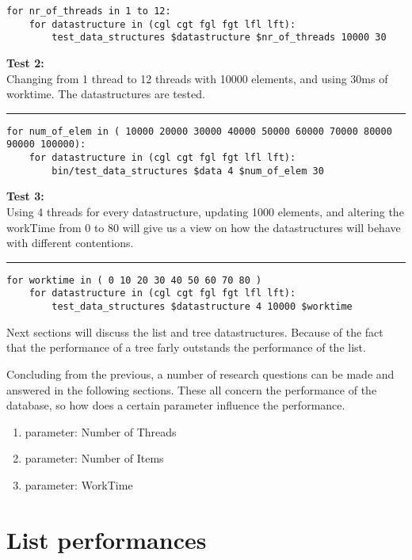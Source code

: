 \documentclass[10pt,a4paper]{article}
\begin{document}
\begin{lstlisting}
for nr_of_threads in 1 to 12:
    for datastructure in (cgl cgt fgl fgt lfl lft):
        test_data_structures $datastructure $nr_of_threads 10000 30  
\end{lstlisting}


\textbf{Test 2:} \\
Changing from 1 thread to 12 threads with 10000 elements, and using 30ms of 
worktime. The datastructures are tested.
\vspace{0.1cm}
\hrule
\vspace{0.1cm}
\begin{lstlisting}
for num_of_elem in ( 10000 20000 30000 40000 50000 60000 70000 80000 90000 100000):
    for datastructure in (cgl cgt fgl fgt lfl lft):
        bin/test_data_structures $data 4 $num_of_elem 30
\end{lstlisting}



\textbf{Test 3:} \\
Using 4 threads for every datastructure, updating 1000 elements, and altering the workTime from 0 to 80 will give us a view on how the datastructures will behave with different contentions. 
\vspace{0.1cm}
\hrule
\vspace{0.1cm}
\begin{lstlisting}
for worktime in ( 0 10 20 30 40 50 60 70 80 )
    for datastructure in (cgl cgt fgl fgt lfl lft):
        test_data_structures $datastructure 4 10000 $worktime  
\end{lstlisting}

Next sections will discuss the list and tree datastructures. Because of the fact that the performance of a tree farly outstands the performance of the list.

Concluding from the previous, a number of research questions can be made and answered in the following sections. These all concern the performance of the database, so how does a certain parameter influence the performance.
\begin{enumerate}
\item parameter: Number of Threads
\item parameter: Number of Items
\item parameter: WorkTime
\end{enumerate}

\section{List performances}
\end{document}
